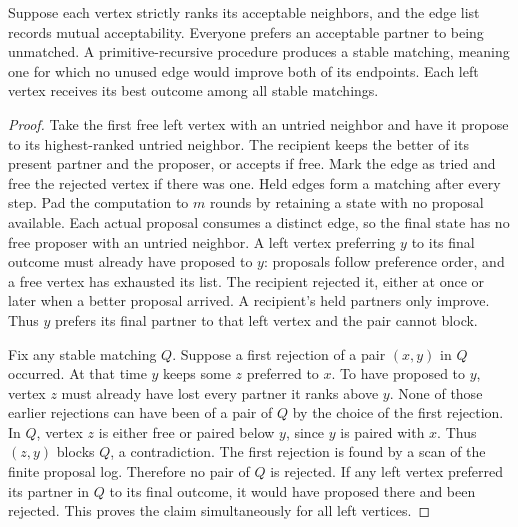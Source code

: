 \begin{theorem}\leavevmode\label{fl:stable}
Suppose each vertex strictly ranks its acceptable neighbors, and the
edge list records mutual acceptability. Everyone prefers an acceptable
partner to being unmatched. A primitive-recursive procedure produces a
stable matching, meaning one for which no unused edge would improve both
of its endpoints. Each left vertex receives its best outcome among all
stable matchings.
\end{theorem}
\begin{proof}
Take the first free left vertex with an untried neighbor and have it
propose to its highest-ranked untried neighbor. The recipient keeps the
better of its present partner and the proposer, or accepts if free.
Mark the edge as tried and free the rejected vertex if there was one.
Held edges form a matching after every step. Pad the computation to
$m$ rounds by retaining a state with no proposal available. Each
actual proposal consumes a distinct edge, so the final state has no
free proposer with an untried neighbor. A left vertex preferring $y$
to its final outcome must already have proposed to $y$: proposals
follow preference order, and a free vertex has exhausted its list.
The recipient rejected it, either at once or later when a better
proposal arrived. A recipient's held partners only improve. Thus
$y$ prefers its final partner to that left vertex and the pair cannot
block.

Fix any stable matching $Q$. Suppose a first rejection of a pair
$(x,y)$ in $Q$ occurred. At that time $y$ keeps some $z$ preferred
to $x$. To have proposed to $y$, vertex $z$ must already have lost
every partner it ranks above $y$. None of those earlier rejections
can have been of a pair of $Q$ by the choice of the first rejection.
In $Q$, vertex $z$ is either free or paired below $y$, since $y$ is
paired with $x$. Thus $(z,y)$ blocks $Q$, a contradiction. The first
rejection is found by a scan of the finite proposal log. Therefore
no pair of $Q$ is rejected. If any left vertex preferred its partner
in $Q$ to its final outcome, it would have proposed there and been
rejected. This proves the claim simultaneously for all left vertices.
\end{proof}


